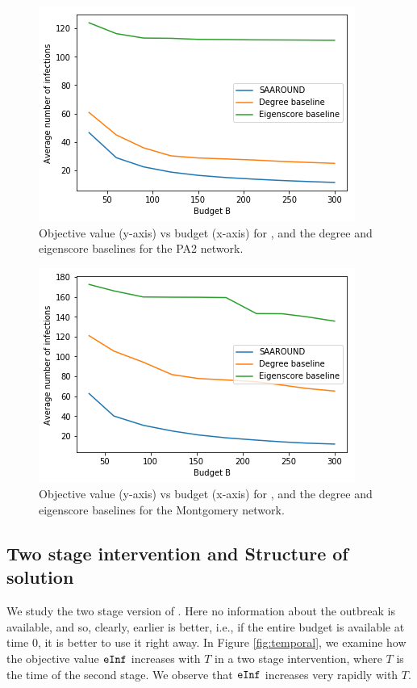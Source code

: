 \begin{figure}[!h]
    \centering
    \includegraphics[scale = 0.55]{Figuresnew/pa2_obj.png}
    \caption{Objective value (y-axis) vs budget (x-axis) for \algo{}, and the degree and eigenscore baselines for the PA2 network.}
    \label{fig:pa2approx}
\end{figure}

\begin{figure}[!h]
    \centering
    \includegraphics[scale = 0.6]{Figuresnew/mont_obj.png}
    \caption{Objective value (y-axis) vs budget (x-axis) for \algo{}, and the degree and eigenscore baselines for the Montgomery network.}
    \label{fig:mont-approx}
\end{figure}

\subsection{Two stage intervention and Structure of solution}
We study the two stage version of \prob{}. Here no information about the outbreak is available, and so, clearly, earlier is better, i.e., if the entire budget is available at time $0$, it is better to use it right away. In Figure \ref{fig:temporal}, we examine how the objective value $\texttt{eInf}{}$ increases with $T$ in a two stage intervention, where $T$ is the time of the second stage. We observe that $\texttt{eInf}{}$ increases very rapidly with $T$.

